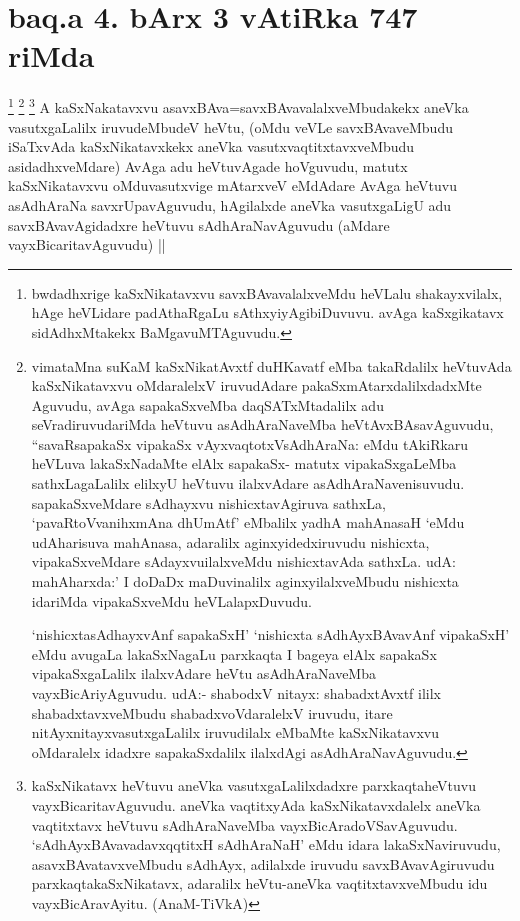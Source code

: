 \section*{baq.a 4. bArx 3 vAtiRka 747 riMda}

\begin{artha}
\footnote[1]{bwdadhxrige kaSxNikatavxvu savxBAvavalalxveMdu heVLalu shakayxvilalx, hAge heVLidare padAthaRgaLu sAthxyiyAgibiDuvuvu. avAga kaSxgikatavx sidAdhxMtakekx BaMgavuMTAguvudu.}
\footnote[2]{vimataMna suKaM kaSxNikatAvxtf duHKavatf eMba takaRdalilx heVtuvAda kaSxNikatavxvu oMdaralelxV iruvudAdare pakaSxmAtarxdalilxdadxMte Aguvudu, avAga sapakaSxveMba daqSATxMtadalilx adu seVradiruvudariMda heVtuvu asAdhAraNaveMba heVtAvxBAsavAguvudu, ``savaRsapakaSx vipakaSx vAyxvaqtotxV\s sAdhAraNa: eMdu tAkiRkaru heVLuva lakaSxNadaMte elAlx sapakaSx- matutx vipakaSxgaLeMba sathxLagaLalilx elilxyU heVtuvu ilalxvAdare asAdhAraNavenisuvudu. sapakaSxveMdare sAdhayxvu nishicxtavAgiruva sathxLa, `pavaRtoVvanihxmAna dhUmAtf' eMbalilx yadhA mahAnasaH `eMdu udAharisuva mahAnasa, adaralilx aginxyidedxiruvudu nishicxta, vipakaSxveMdare sAdayxvuilalxveMdu nishicxtavAda sathxLa. udA: mahAharxda:' I doDaDx maDuvinalilx aginxyilalxveMbudu nishicxta idariMda vipakaSxveMdu heVLalapxDuvudu.

`nishicxtasAdhayxvAnf sapakaSxH' `nishicxta sAdhAyxBAvavAnf vipakaSxH' eMdu avugaLa lakaSxNagaLu parxkaqta I bageya elAlx sapakaSx vipakaSxgaLalilx ilalxvAdare heVtu asAdhAraNaveMba vayxBicAriyAguvudu. udA:- shabodxV nitayx: shabadxtAvxtf ililx shabadxtavxveMbudu shabadxvoVdaralelxV iruvudu, itare nitAyxnitayxvasutxgaLalilx iruvudilalx eMbaMte kaSxNikatavxvu oMdaralelx idadxre sapakaSxdalilx ilalxdAgi asAdhAraNavAguvudu.}
\footnote[3]{kaSxNikatavx heVtuvu aneVka vasutxgaLalilxdadxre parxkaqtaheVtuvu vayxBicaritavAguvudu. aneVka vaqtitxyAda kaSxNikatavxdalelx aneVka vaqtitxtavx heVtuvu sAdhAraNaveMba vayxBicAradoVSavAguvudu. `sAdhAyxBAvavadavxqqtitxH sAdhAraNaH' eMdu idara lakaSxNaviruvudu, asavxBAvatavxveMbudu sAdhAyx, adilalxde iruvudu savxBAvavAgiruvudu parxkaqtakaSxNikatavx, adaralilx heVtu-aneVka vaqtitxtavxveMbudu idu vayxBicAravAyitu. (AnaM-TiVkA)}
A kaSxNakatavxvu asavxBAva=savxBAvavalalxveMbudakekx aneVka vasutxgaLalilx iruvudeMbudeV heVtu, (oMdu veVLe savxBAvaveMbudu iSaTxvAda kaSxNikatavxkekx aneVka vasutxvaqtitxtavxveMbudu asidadhxveMdare) AvAga adu heVtuvAgade hoVguvudu, matutx kaSxNikatavxvu oMduvasutxvige mAtarxveV eMdAdare AvAga heVtuvu asAdhAraNa savxrUpavAguvudu, hAgilalxde aneVka vasutxgaLigU adu savxBAvavAgidadxre heVtuvu sAdhAraNavAguvudu (aMdare vayxBicaritavAguvudu) ||
\end{artha}

